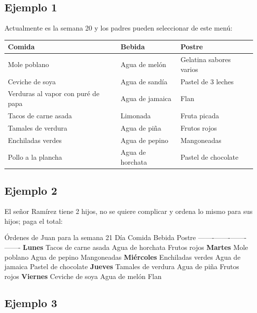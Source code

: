 \documentclass[
  letterpaper,
  DIV=11,
  numbers=noendperiod]{scrreprt}
\begin{document}
\subsection{Ejemplo 1}\label{ejemplo-1}

Actualmente es la semana 20 y los padres pueden seleccionar de este
menú:

\begin{longtable}[]{@{}lll@{}}
\toprule\noalign{}
Comida & Bebida & Postre \\
\midrule\noalign{}
\endhead
\bottomrule\noalign{}
\endlastfoot
Mole poblano & Agua de melón & Gelatina sabores varios \\
Ceviche de soya & Agua de sandía & Pastel de 3 leches \\
Verduras al vapor con puré de papa & Agua de jamaica & Flan \\
Tacos de carne asada & Limonada & Fruta picada \\
Tamales de verdura & Agua de piña & Frutos rojos \\
Enchiladas verdes & Agua de pepino & Mangoneadas \\
Pollo a la plancha & Agua de horchata & Pastel de chocolate \\
\end{longtable}

\subsection{Ejemplo 2}\label{ejemplo-2}

El señor Ramírez tiene 2 hijos, no se quiere complicar y ordena lo mismo
para sus hijos; paga el total:

Órdenes de Juan para la semana 21 \textbar{} Día \textbar{} Comida
\textbar{} Bebida \textbar{} Postre \textbar{}
\textbar-------\textbar-------\textbar-------\textbar-------\textbar{}
\textbar{} \textbf{Lunes} \textbar{} Tacos de carne asada\textbar{} Agua
de horchata \textbar{} Frutos rojos\textbar{} \textbar{} \textbf{Martes}
\textbar{} Mole poblano \textbar{} Agua de pepino \textbar{}
Mangoneadas\textbar{} \textbar{} \textbf{Miércoles} \textbar{}
Enchiladas verdes\textbar{} Agua de jamaica \textbar{} Pastel de
chocolate\textbar{} \textbar{} \textbf{Jueves} \textbar{} Tamales de
verdura \textbar{} Agua de piña \textbar{} Frutos rojos\textbar{}
\textbar{} \textbf{Viernes} \textbar{} Ceviche de soya\textbar{} Agua de
melón\textbar{} Flan\textbar{}

\subsection{Ejemplo 3}\label{ejemplo-3}
\end{document}
